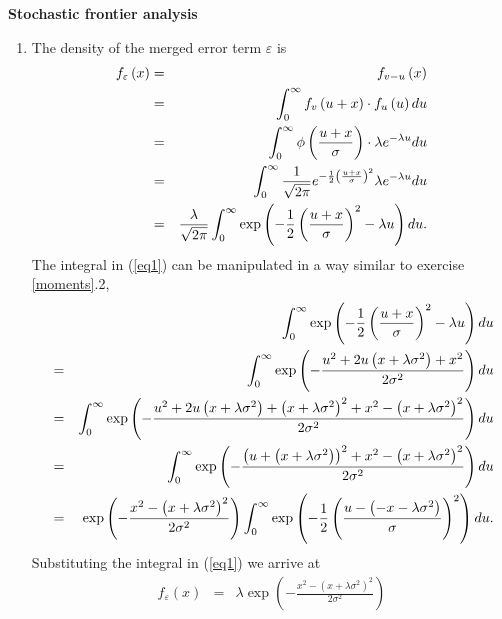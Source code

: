 \begin{Solution}{12.10}
\textbf{Stochastic frontier analysis}

\begin{enumerate}
\item The density of the merged error term $\varepsilon $ is%
\begin{eqnarray}
f_{\varepsilon }\left( x\right)  &=&f_{v-u}\left( x\right)   \notag \\
&=&\int_{0}^{\infty }f_{v}\left( u+x\right) \cdot f_{u}\left( u\right) du
\notag \\
&=&\int_{0}^{\infty }\phi \left( \frac{u+x}{\sigma }\right) \cdot \lambda
e^{-\lambda u}du  \notag \\
&=&\int_{0}^{\infty }\frac{1}{\sqrt{2\pi }}e^{-\frac{1}{2}\left( \frac{u+x}{%
\sigma }\right) ^{2}}\lambda e^{-\lambda u}du  \notag \\
&=&\frac{\lambda }{\sqrt{2\pi }}\int_{0}^{\infty }\exp \left( -\frac{1}{2}%
\left( \frac{u+x}{\sigma }\right) ^{2}-\lambda u\right) du.  \label{eq1}
\end{eqnarray}%
The integral in (\ref{eq1}) can be manipulated in a way similar to exercise %
\ref{moments}.2,%
\begin{eqnarray*}
&&\int_{0}^{\infty }\exp \left( -\frac{1}{2}\left( \frac{u+x}{\sigma }%
\right) ^{2}-\lambda u\right) du \\
&=&\int_{0}^{\infty }\exp \left( -\frac{u^{2}+2u\left( x+\lambda \sigma
^{2}\right) +x^{2}}{2\sigma ^{2}}\right) du \\
&=&\int_{0}^{\infty }\exp \left( -\frac{u^{2}+2u\left( x+\lambda \sigma
^{2}\right) +\left( x+\lambda \sigma ^{2}\right) ^{2}+x^{2}-\left( x+\lambda
\sigma ^{2}\right) ^{2}}{2\sigma ^{2}}\right) du \\
&=&\int_{0}^{\infty }\exp \left( -\frac{\left( u+\left( x+\lambda \sigma
^{2}\right) \right) ^{2}+x^{2}-\left( x+\lambda \sigma ^{2}\right) ^{2}}{%
2\sigma ^{2}}\right) du \\
&=&\exp \left( -\frac{x^{2}-\left( x+\lambda \sigma ^{2}\right) ^{2}}{%
2\sigma ^{2}}\right) \int_{0}^{\infty }\exp \left( -\frac{1}{2}\left( \frac{%
u-\left( -x-\lambda \sigma ^{2}\right) }{\sigma }\right) ^{2}\right) du.
\end{eqnarray*}%
Substituting the integral in (\ref{eq1}) we arrive at%
\begin{eqnarray*}
f_{\varepsilon }\left( x\right)  &=&\lambda \exp \left( -\frac{x^{2}-\left(
x+\lambda \sigma ^{2}\right) ^{2}}{2\sigma ^{2}}\right)  \\

\end{eqnarray*}
\end{enumerate}
\end{Solution}
